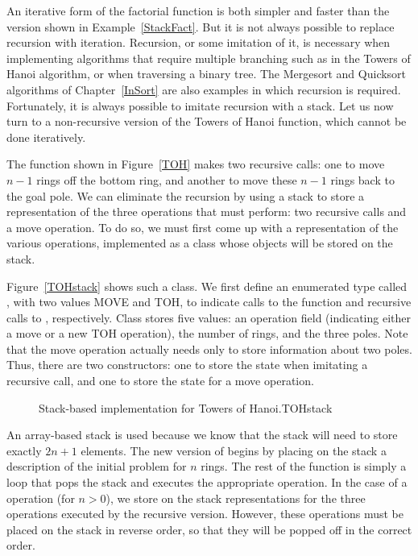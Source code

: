 An iterative form of the factorial function is both
simpler and faster than the version shown in Example~\ref{StackFact}.
But it is not always possible to replace recursion with iteration.
Recursion, or some imitation of it, is necessary when implementing
algorithms that require multiple branching such as in the Towers of
Hanoi algorithm, or when
traversing a binary tree.
The Mergesort and
Quicksort algorithms of
Chapter~\ref{InSort} are also examples in which recursion is required.
Fortunately, it is always possible to imitate recursion with a stack.
Let us now turn to a non-recursive version of the Towers of
Hanoi function, which cannot be done iteratively.

\begin{example}
The  function shown in Figure~\ref{TOH}
makes two recursive calls: one to move $n-1$ rings off the bottom
ring, and another to move these $n-1$ rings back to the goal pole.
We can eliminate the recursion by using a stack to store a
representation of the three operations that  must perform:
two recursive calls and a move operation.
To do so, we must first come up with a representation of the various
operations, implemented as a class whose objects will be stored on the
stack.

Figure~\ref{TOHstack} shows such a class.
We first define an enumerated type called , with two
values MOVE and TOH, to indicate calls to the  function and
recursive calls to , respectively.
Class  stores five values: an operation field (indicating
either a move or a new TOH operation), the number of rings, and the
three poles.
Note that the move operation actually needs only to store information
about two poles.
Thus, there are two constructors: one to store the state when
imitating a recursive call, and one to store the state for a move
operation.

\begin{figure}

\bigskip

\vspace{-\bigskipamount}
\vspace{-\medskipamount}

{Stack-based implementation for Towers of Hanoi.}{TOHstack}
\smallskip
\end{figure}

An array-based stack is used because we know that the stack
will need to store exactly $2n+1$ elements.
The new version of  begins by placing on the stack a
description of the initial problem for $n$ rings.
The rest of the function is simply a  loop that pops the
stack and executes the appropriate operation.
In the case of a  operation (for $n>0$), we store on the
stack representations for the three operations executed by the
recursive version.
However, these operations must be placed on the stack in reverse
order, so that they will be popped off in the correct order.
\end{example}

